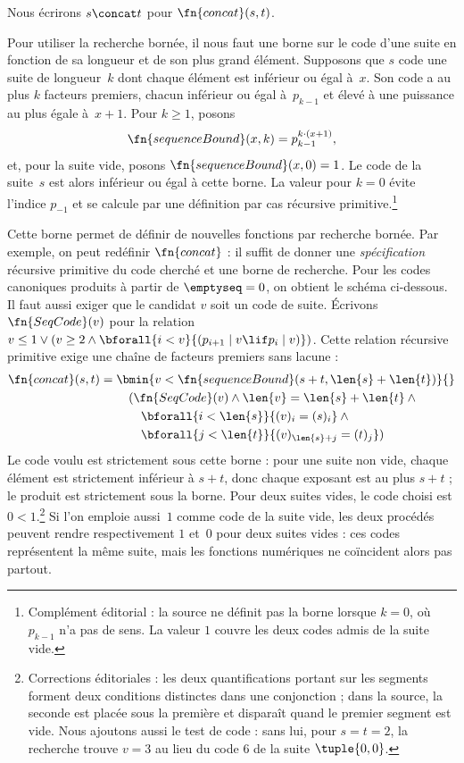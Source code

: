 \documentclass[../../../include/open-logic-section]{subfiles}
\begin{document}
Nous écrirons $s\concat t$ pour $\fn{concat}(s,t)$.

Pour utiliser la recherche bornée, il nous faut une borne
sur le code d'une suite en fonction de sa longueur et de
son plus grand élément. Supposons que $s$ code une suite
de longueur~$k$ dont chaque élément est inférieur ou égal
à~$x$. Son code a au plus $k$ facteurs premiers, chacun
inférieur ou égal à~$p_{k-1}$ et élevé à une puissance
au plus égale à~$x+1$. Pour $k\geq1$, posons
\[
\fn{sequenceBound}(x,k) = p_{k-1}^{k \cdot (x+1)},
\]
et, pour la suite vide, posons
$\fn{sequenceBound}(x,0)=1$. Le code de la suite~$s$
est alors inférieur ou égal à cette borne. La valeur
pour $k=0$ évite l'indice $p_{-1}$ et se calcule par
une définition par cas récursive primitive.\footnote{Complément éditorial : la source ne définit pas la borne lorsque $k=0$, où $p_{k-1}$ n'a pas de sens. La valeur $1$ couvre les deux codes admis de la suite vide.}

Cette borne permet de définir de nouvelles fonctions
par recherche bornée. Par exemple, on peut redéfinir
$\fn{concat}$ : il suffit de donner une
\emph{spécification} récursive primitive du code
cherché et une borne de recherche. Pour les codes
canoniques produits à partir de $\emptyseq=0$, on obtient le schéma ci-dessous. Il faut aussi exiger que le candidat $v$ soit un code de suite. Écrivons $\fn{SeqCode}(v)$ pour la relation $v\leq1\lor(v\geq2\land\bforall{i<v}{(p_{i+1}\mid v\lif p_i\mid v)})$. Cette relation récursive primitive exige une chaîne de facteurs premiers sans lacune :
\begin{align*}
  \fn{concat}(s,t) = {} & \bmin{v < \fn{sequenceBound}(s+t,\len{s} +
    \len{t})}{} \\
  & \quad(\fn{SeqCode}(v) \land \len{v} = \len{s} + \len{t} \land {}\\
    & \qquad \bforall{i < \len{s}}{(v)_i = (s)_i} \land {} \\
    & \qquad \bforall{j < \len{t}}{(v)_{\len{s}+j} = (t)_j})
\end{align*}
Le code voulu est strictement sous cette borne : pour une
suite non vide, chaque élément est strictement inférieur à $s+t$, donc chaque exposant est au plus $s+t$ ; le produit est strictement sous la borne.
Pour deux suites vides, le code choisi est $0<1$.\footnote{Corrections éditoriales : les deux quantifications portant sur les segments forment deux conditions distinctes dans une conjonction ; dans la source, la seconde est placée sous la première et disparaît quand le premier segment est vide. Nous ajoutons aussi le test de code : sans lui, pour $s=t=2$, la recherche trouve $v=3$ au lieu du code $6$ de la suite $\tuple{0,0}$.}
Si l'on emploie aussi~$1$ comme code de la suite vide,
les deux procédés peuvent rendre respectivement $1$ et~$0$
pour deux suites vides : ces codes représentent la même suite,
mais les fonctions numériques ne coïncident alors pas partout.
\end{document}
